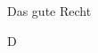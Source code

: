 \documentclass[fontsize=12pt]{scrartcl}
\begin{document}
	{\huge Das gute Recht}
	\vspace{15pt}
	
	{\LARGE D}
\end{document}
